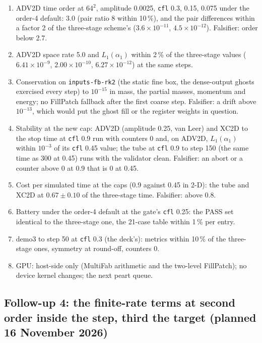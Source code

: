 \documentclass[11pt,a4paper]{article}
\newcommand{\code}[1]{\texttt{\small #1}}
\begin{document}
\begin{enumerate}[nosep]
\item ADV2D time order at $64^2$, amplitude 0.0025, \code{cfl} 0.3,
      0.15, 0.075 under the order-4 default: 3.0 (pair ratio 8 within 10\,\%),
      and the pair differences within a factor 2 of the three-stage
      scheme's ($3.6\times10^{-11}$, $4.5\times10^{-12}$).  Falsifier:
      order below 2.7.
\item ADV2D space rate 5.0 and $L_1(\alpha_1)$ within 2\,\% of the
      three-stage values ($6.41\times10^{-9}$, $2.00\times10^{-10}$,
      $6.27\times10^{-12}$) at the same steps.
\item Conservation on \code{inputs-fb-rk2} (the static fine box, the
      dense-output ghosts exercised every step) to $10^{-15}$ in mass,
      the partial masses, momentum and energy; no FillPatch fallback
      after the first coarse step.  Falsifier: a drift above
      $10^{-13}$, which would put the ghost fill or the register weights
      in question.
\item Stability at the new cap: ADV2D (amplitude 0.25, van Leer) and
      XC2D to the stop time at \code{cfl} 0.9 run with counters 0 and,
      on ADV2D, $L_1(\alpha_1)$ within $10^{-3}$ of its \code{cfl} 0.45
      value; the tube at \code{cfl} 0.9 to step 150 (the same time as
      300 at 0.45) runs with the validator clean.  Falsifier: an abort
      or a counter above 0 at 0.9 that is 0 at 0.45.
\item Cost per simulated time at the caps (0.9 against 0.45 in 2-D):
      the tube and XC2D at $0.67 \pm 0.10$ of the three-stage time.
      Falsifier: above 0.8.
\item Battery under the order-4 default at the gate's \code{cfl} 0.25:
      the PASS set identical to the three-stage one, the 21-case table
      within 1\,\% per entry.
\item demo3 to step 50 at \code{cfl} 0.3 (the deck's): metrics within
      10\,\% of the three-stage ones, symmetry at round-off, counters 0.
\item GPU: host-side only (MultiFab arithmetic and the two-level
      FillPatch); no device kernel changes; the next peart queue.
\end{enumerate}

\subsection*{Follow-up 4: the finite-rate terms at second order inside the step, third the target (planned 16 November 2026)}
\label{sec:fu4plan}
\end{document}
